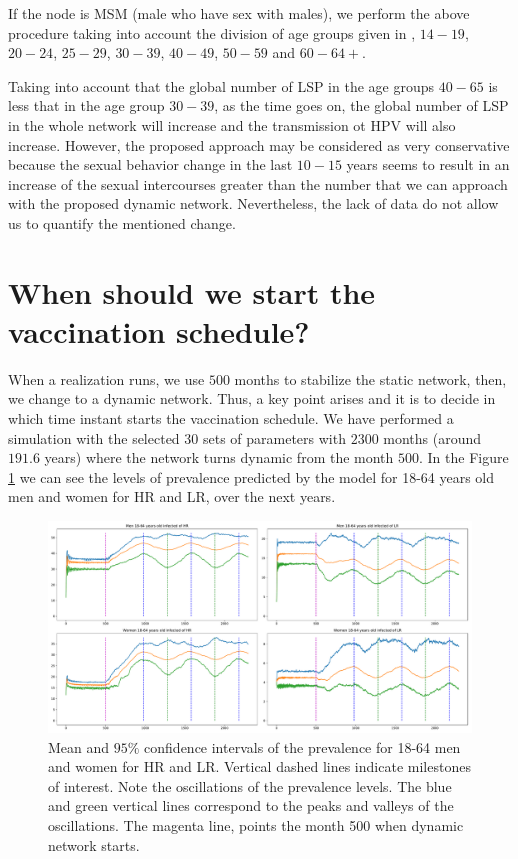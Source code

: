 If the node is MSM (male who have sex with males), we perform the above procedure taking into account the division of age groups given in \cite{Durex2002}, $14-19$, $20-24$, $25-29$, $30-39$, $40-49$, $50-59$ and $60-64+$.

Taking into account that the global number of LSP in the age groups $40-65$ is less that in the age group $30-39$, as the time goes on, the global number of LSP in the whole network will increase and the transmission ot HPV will also increase. However, the proposed approach may be considered as very conservative because the sexual behavior change in the last $10-15$ years seems to result in an increase of the sexual intercourses greater than the number that we can approach with the proposed dynamic network. Nevertheless, the lack of data do not allow us to quantify the mentioned change.


\section{When should we start the vaccination schedule?} 
When a realization runs, we use $500$ months to stabilize the static network, then, we change to a dynamic network. Thus, a key point arises and it is to decide in which time instant starts the vaccination schedule. We have performed a simulation with the selected $30$ sets of parameters with $2300$ months (around $191.6$ years) where the network turns dynamic from the month $500$. In the Figure \ref{fig:Estudio_ciclos} we can see the levels of prevalence predicted by the model for 18-64 years old men and women for HR and LR, over the next years.

\begin{figure}[h!]
	\centering
	\includegraphics[width=\linewidth]{IMGs/2.-New_features/Estudio_ciclos.pdf}
	\caption{Mean and $95\%$ confidence intervals of the prevalence for 18-64 men and women for HR and LR. Vertical dashed lines indicate milestones of interest. Note the oscillations of the prevalence levels. The blue and green vertical lines correspond to the peaks and valleys of the oscillations. The magenta line, points the month 500 when dynamic network starts.}
	\label{fig:Estudio_ciclos}
\end{figure}

